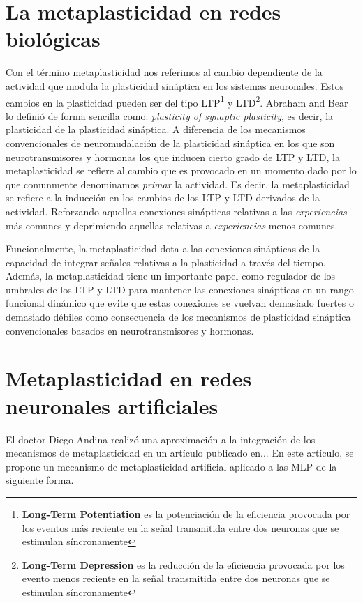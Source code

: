 \documentclass[10pt,a4paper, twocolumn]{report}
\begin{document}
\section{La metaplasticidad en redes biológicas}
Con el término metaplasticidad nos referimos al cambio dependiente de la actividad que modula la plasticidad sináptica en los sistemas neuronales. Estos cambios en la plasticidad pueden ser del tipo LTP\footnote{\textbf{Long-Term Potentiation} es la potenciación de la eficiencia provocada por los eventos más reciente en la señal transmitida entre dos neuronas que se estimulan síncronamente} y LTD\footnote{\textbf{Long-Term Depression} es la reducción de la eficiencia provocada por los evento menos reciente en la señal transmitida entre dos neuronas que se estimulan síncronamente}. Abraham and Bear lo definió de forma sencilla como: \textit{plasticity of synaptic plasticity}, es decir, la plasticidad de la plasticidad sináptica. A diferencia de los mecanismos convencionales de neuromudalación de la plasticidad sináptica en los que son neurotransmisores y hormonas los que inducen cierto grado de LTP y LTD, la metaplasticidad se refiere al cambio que es provocado en un momento dado por lo que comunmente denominamos \textit{primar} la actividad. Es decir, la metaplasticidad se refiere a la inducción en los cambios de los LTP y LTD derivados de la actividad. Reforzando aquellas conexiones sinápticas relativas a las \textit{experiencias} más comunes y deprimiendo aquellas relativas a \textit{experiencias} menos comunes.

Funcionalmente, la metaplasticidad dota a las conexiones sinápticas de la capacidad de integrar señales relativas a la plasticidad a través del tiempo. Además, la metaplasticidad tiene un importante papel como regulador de los umbrales de los LTP y LTD para mantener las conexiones sinápticas en un rango funcional dinámico que evite que estas conexiones se vuelvan demasiado fuertes o demasiado débiles como consecuencia de los mecanismos de plasticidad sináptica convencionales basados en neurotransmisores y hormonas.

\section{Metaplasticidad en redes neuronales artificiales}
El doctor Diego Andina realizó una aproximación a la integración de los mecanismos de metaplasticidad en un artículo publicado en... En este artículo, se propone un mecanismo de metaplasticidad artificial aplicado a las MLP de la siguiente forma.
\end{document}
